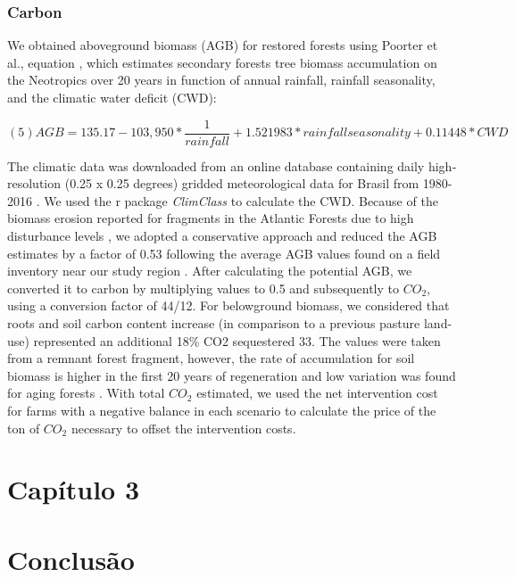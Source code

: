 \documentclass[
	12pt,				%
	oneside,			%
	a4paper,			%
	chapter=TITLE,		%
	section=TITLE,		%
	brazil,			%
	english				%
	]{abntex2}
\begin{document}
\hypertarget{carbon}{%
\subsection{Carbon}\label{carbon}}

We obtained aboveground biomass (AGB) for restored forests using Poorter et al., equation \autocite*{poorter_biomass_2016}, which estimates secondary forests tree biomass accumulation on the Neotropics over 20 years in function of annual rainfall, rainfall seasonality, and the climatic water deficit (CWD):

\[ (5)  AGB = 135.17 - 103,950 * \frac{1}{rainfall} + 1.521983 * rainfall seasonality + 0.11448 * CWD \]

The climatic data was downloaded from an online database containing daily high‐resolution (0.25 x 0.25 degrees) gridded meteorological data for Brasil from 1980-2016 \autocite{xavier_daily_2016}. We used the r package \emph{ClimClass} \autocite{eccel_climclass_2016}to calculate the CWD. Because of the biomass erosion reported for fragments in the Atlantic Forests due to high disturbance levels \autocite{de_lima_erosion_2020}, we adopted a conservative approach and reduced the AGB estimates by a factor of 0.53 following the average AGB values found on a field inventory near our study region \autocite{d_albertas_lack_2018}. After calculating the potential AGB, we converted it to carbon by multiplying values to 0.5 and subsequently to \(CO_2\), using a conversion factor of 44/12. For belowground biomass, we considered that roots and soil carbon content increase (in comparison to a previous pasture land-use) represented an additional 18\% CO2 sequestered 33. The values were taken from a remnant forest fragment, however, the rate of accumulation for soil biomass is higher in the first 20 years of regeneration and low variation was found for aging forests \autocite{brancalion_cost_2020,jones_above-_2019}. With total \(CO_2\) estimated, we used the net intervention cost for farms with a negative balance in each scenario to calculate the price of the ton of \(CO_2\) necessary to offset the intervention costs.

\hypertarget{capuxedtulo-3}{%
\chapter{Capítulo 3}\label{capuxedtulo-3}}

\hypertarget{conclusuxe3o}{%
\chapter{Conclusão}\label{conclusuxe3o}}
\end{document}
